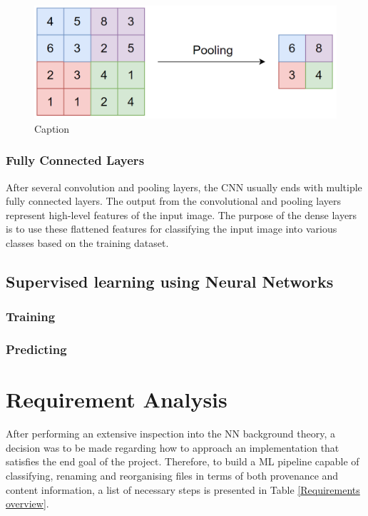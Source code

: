 \begin{figure}[H]
  \centering
  \includegraphics[scale=0.3]{Images/pooling.png}
  \caption{Caption}
  \label{Pooling}
\end{figure}

\subsubsection*{Fully Connected Layers}

After several convolution and pooling layers, the CNN usually ends with multiple fully connected layers. The output from the convolutional and pooling layers represent high-level features of the input image. The purpose of the dense layers is to use these flattened features for classifying the input image into various classes based on the training dataset. \\

\subsection{Supervised learning using Neural Networks}

\subsubsection*{Training}

\subsubsection*{Predicting}


\section{Requirement Analysis}

After performing an extensive inspection into the NN background theory, a decision was to be made regarding how to approach an implementation that satisfies the end goal of the project. Therefore, to build a ML pipeline capable of classifying, renaming and reorganising files in terms of both provenance and content information, a list of necessary steps is presented in Table \ref{Requirements overview}. \bigskip

